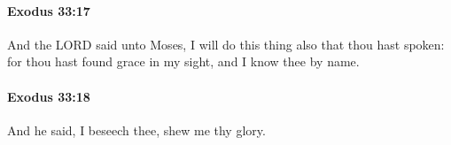 		\paragraph{Exodus 33:17} %
			\label{EXODUS-33-17}

			And the LORD said unto Moses, I will do this thing also that thou hast spoken: for thou hast found grace in my sight, and I know thee by name.


		\paragraph{Exodus 33:18} %
			\label{EXODUS-33-18}

			And he said, I beseech thee, shew me thy glory.


